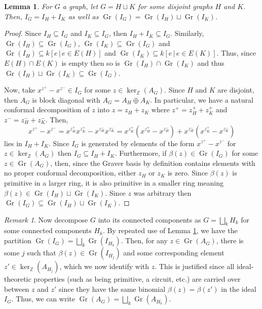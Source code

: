 \documentclass[a4paper, 12pt]{article}
\newcommand{\ZZ}{\mathbb Z}
\theoremstyle{plain}
\newtheorem{lemma}[theorem]{Lemma}
\theoremstyle{definition}
\theoremstyle{remark}
\newtheorem{remark}[theorem]{Remark}
\begin{document}
\begin{lemma}
\label{lem:disjointidealsgraver}
    For $G$ a graph, let $G=H \sqcup K$ for some disjoint graphs $H$ and $K$. Then, $I_G=I_H+I_K$ as well as $\operatorname{Gr}(I_G)=\operatorname{Gr}(I_H) \sqcup \operatorname{Gr}(I_K)$.
\end{lemma}

\begin{proof}
    Since $I_H \subseteq I_G$ and $I_K \subseteq I_G$, then $I_H+I_K \subseteq I_G$. Similarly, $\operatorname{Gr}(I_H) \subseteq \operatorname{Gr}(I_G)$, $\operatorname{Gr}(I_K) \subseteq \operatorname{Gr}(I_G)$ and $\operatorname{Gr}(I_H) \subseteq k[e \,|\, e \in E(H)]$ and $\operatorname{Gr}(I_K) \subseteq k[e \,|\, e \in E(K)]$. Thus, since $E(H) \cap E(K)$ is empty then so is $\operatorname{Gr}(I_H) \cap \operatorname{Gr}(I_K)$ and thus $ \operatorname{Gr}(I_H) \sqcup \operatorname{Gr}(I_K) \subseteq \operatorname{Gr}(I_G)$. 
    
    Now, take $x^{z^+}-x^{z^-} \in I_G$ for some $z \in \ker_\ZZ(A_G)$. Since $H$ and $K$ are disjoint, then $A_G$ is block diagonal with $A_G=A_H \oplus A_K$. In particular, we have a natural conformal decomposition of $z$ into $z=z_H+z_K$ where $z^+=z_H^+ + z_K^+$ and $z^-=z_H^- + z_K^-$. Then, 
    $$x^{z^+}-x^{z^-}=x^{z_H^+}x^{z_K^+}-x^{z_H^-}x^{z_K^-}=x^{z_K^+}(x^{z_H^+}-x^{z_H^-})+x^{z_H^-}(x^{z_K^+}-x^{z_K^-})$$
    lies in $I_H+I_K$. Since $I_G$ is generated by elements of the form $x^{z^+}-x^{z^-}$ for $z \in \ker_\ZZ(A_G)$ then $I_G \subseteq I_H+I_K$. Furthermore, if $\beta(z) \in \operatorname{Gr}(I_G)$ for some $z \in \operatorname{Gr}(A_G)$, then, since the Graver basis by definition contains elements with no proper conformal decomposition, either $z_H$ or $z_K$ is zero. Since $\beta(z)$ is primitive in a larger ring, it is also primitive in a smaller ring meaning $\beta(z) \in \operatorname{Gr}(I_H) \sqcup \operatorname{Gr}(I_K)$. Since $z$ was arbitrary then $\operatorname{Gr}(I_G) \subseteq \operatorname{Gr}(I_H) \sqcup \operatorname{Gr}(I_K)$.
\end{proof}

\begin{remark} \label{rem:disjointcomps}
    Now decompose $G$ into its connected components as $G=\bigsqcup_k H_k$ for some connected components $H_k$. By repeated use of Lemma \ref{lem:disjointidealsgraver}, we have the partition $\operatorname{Gr}(I_G)=\bigsqcup_k \operatorname{Gr}(I_{H_k})$. Then, for any $z \in \operatorname{Gr}(A_G)$, there is some $j$ such that $\beta(z) \in \operatorname{Gr}(I_{H_j})$ and some corresponding element $z' \in \ker_\ZZ(A_{H_j})$, which we now identify with $z$. This is justified since all ideal-theoretic properties (such as being primitive, a circuit, etc.) are carried over between $z$ and $z'$ since they have the same binomial $\beta(z)=\beta(z')$ in the ideal $I_G$. Thus, we can write $\operatorname{Gr}(A_G)=\bigsqcup_k \operatorname{Gr}(A_{H_k})$.
\end{remark}
\end{document}
